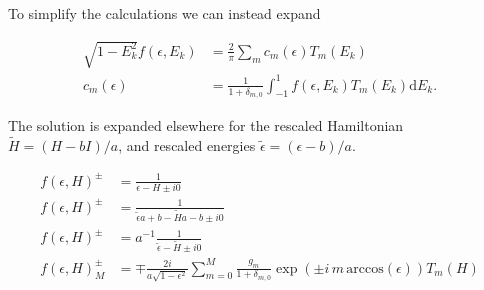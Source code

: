 \documentclass[10pt, onecolumn, aps, prb, superscriptaddress, floatfix, showpacs, notitlepage]{revtex4-1}
\begin{document}
To simplify the calculations we can instead expand

\begin{align}
\sqrt{1-E_k^2}f(\epsilon, E_k) &= \frac{2}{\pi}\sum_m c_m(\epsilon)T_m(E_k)\\
c_m(\epsilon) &=\frac{1}{1+\delta_{m,0}}
\int_{-1}^1 {f(\epsilon, E_k) T_m(E_k)}\mathrm{d}E_k.
\end{align}


The solution is expanded elsewhere\cite{Garcia2014} for the rescaled
Hamiltonian $\tilde{H}=(H-bI)/a$, and rescaled energies
$\tilde{\epsilon}=(\epsilon-b)/a$.

\begin{align}
f(\epsilon, H)^\pm &= \frac{1}{\epsilon-H \pm i0}\\
f(\epsilon, H)^\pm &= \frac{1}{\tilde{\epsilon}a+b-\tilde{H}a-b \pm i0}\\
f(\epsilon, H)^\pm &= a^{-1}\frac{1}{\tilde{\epsilon}-\tilde{H} \pm i0}\\
f(\epsilon, H)^\pm_M &= \mp \frac{2i}{a\sqrt{1-\epsilon^2}}
\sum_{m=0}^{M}\frac{g_m}{1+\delta_{m,0}}
\exp(\pm i\,m\,\mathrm{arccos}(\epsilon)) T_m(H)
\end{align}


%


\end{document}
